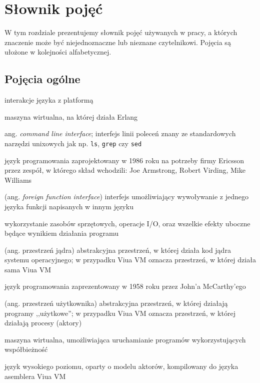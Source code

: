 \section{Słownik pojęć}
\label{slownik_pojec}

W tym rozdziale prezentujemy słownik pojęć używanych w pracy, a których znaczenie może być niejednoznaczne lub
nieznane czytelnikowi.
Pojęcia są ułożone w kolejności alfabetycznej.

\subsection{Pojęcia ogólne}
\label{slownik_pojec_ogolnych}

\begin{labeling}{interakcje języka z platformą}
	\item [BEAM] maszyna wirtualna, na której działa Erlang
    \item [CLI] ang. \emph{command line interface}; interfejs linii poleceń
        znany ze standardowych narzędzi unixowych jak np. \texttt{ls},
        \texttt{grep} czy \texttt{sed}
	\item [Erlang] język programowania zaprojektowany w 1986 roku na potrzeby firmy Ericsson przez
		zespół, w którego skład wchodzili: Joe Armstrong, Robert Virding, Mike Williams
    \item [FFI] (ang. \emph{foreign function interface}) interfejs umożliwiający wywoływanie z jednego języka
        funkcji napisanych w innym języku
    \item[interakcje języka z platformą] wykorzystanie zasobów sprzętowych, operacje I/O, oraz wszelkie
        efekty uboczne będące wynikiem działania programu
	\item [\emph{kernelspace}] (ang. przestrzeń jądra) abstrakcyjna przestrzeń, w której działa kod jądra
		systemu operacyjnego; w przypadku Viua VM oznacza przestrzeń, w której działa sama Viua VM
	\item [Lisp] język programowania zaprezentowany w 1958 roku przez John'a McCarthy'ego
	\item [\emph{userspace}] (ang. przestrzeń użytkownika) abstrakcyjna przestrzeń, w której działają programy
		,,użytkowe''; w przypadku Viua VM oznacza przestrzeń, w której działają procesy (aktory)
    \item [Viua VM] maszyna wirtualna, umożliwiająca uruchamianie programów
        wykorzystujących współbieżność
    \item [\ViuAct] język wysokiego poziomu, oparty o modelu aktorów, kompilowany
        do języka asemblera Viua VM
\end{labeling}

